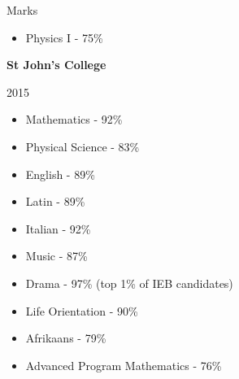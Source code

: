 \documentclass{resume} %
\begin{document}
\begin{rSection}{Marks}
\begin{itemize}
	\item Physics I - 75\%
\end{itemize}
{\bf St John's College}
\item 2015
\begin{itemize}
  \item Mathematics - 92\%
  \item Physical Science  - 83\%
  \item English - 89\%
  \item Latin - 89\%
  \item Italian - 92\%
  \item Music - 87\%
  \item Drama - 97\% (top 1\% of IEB candidates)
  \item Life Orientation - 90\%
  \item Afrikaans - 79\%
  \item Advanced Program Mathematics - 76\%
\end{itemize}

\end{rSection}
\end{document}
